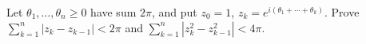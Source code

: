 Let $\theta_1,\ldots,\theta_n\ge0$ have sum $2\pi$, and put $z_0=1$, $z_k=e^{i(\theta_1+\cdots+\theta_k)}$. Prove $\sum_{k=1}^n|z_k-z_{k-1}|<2\pi$ and $\sum_{k=1}^n|z_k^2-z_{k-1}^2|<4\pi$.
